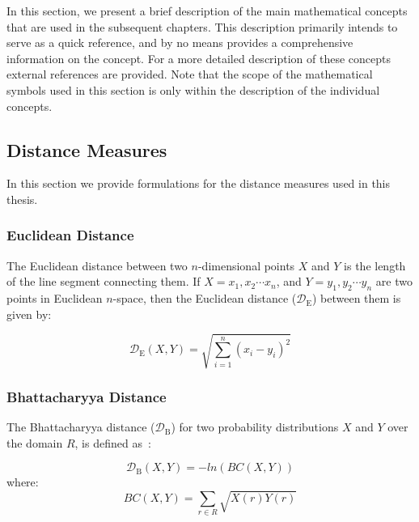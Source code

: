 In this section, we present a brief description of the main mathematical concepts that are used in the subsequent chapters. This description primarily intends to serve as a quick reference, and by no means provides a comprehensive information on the concept. For a more detailed description of these concepts external references are provided. Note that the scope of the mathematical symbols used in this section is only within the description of the individual concepts. 

\subsection{Distance Measures}
\label{sec:distance_measures}

In this section we provide formulations for the distance measures used in this thesis. 

\subsubsection{Euclidean Distance}
\label{sec:euclidean_distance}

The Euclidean distance between two $n$-dimensional points $X$ and $Y$ is the length of the line segment connecting them. If $X=x_1, x_2\cdots x_n$, and $Y=y_1, y_2\cdots y_n$ are two points in Euclidean $n$-space, then the Euclidean distance ($\mathcal{D}_\mathrm{E}$) between them is given by:

\begin{equation}
\label{eq:euclidean_distance}
	\mathcal{D}_\mathrm{E}(X,Y) = \sqrt{\sum_{i=1}^{n}(x_i-y_i)^2}	
\end{equation}

\subsubsection{Bhattacharyya Distance}
\label{sec:bhattacharya_distance}

The Bhattacharyya distance ($\mathcal{D}_\mathrm{B}$) for two probability distributions $X$ and $Y$ over the domain $R$, is defined as~\citep{bhattacharyya1946measure}:

\begin{equation}
\label{eq:bhattacharya_distance}
\mathcal{D}_\mathrm{B}(X,Y) = -ln(BC(X,Y)) 
\end{equation}
where:
\begin{equation}
BC(X,Y) = \sum_{r \in R} \sqrt{X(r)Y(r)}
\end{equation}


